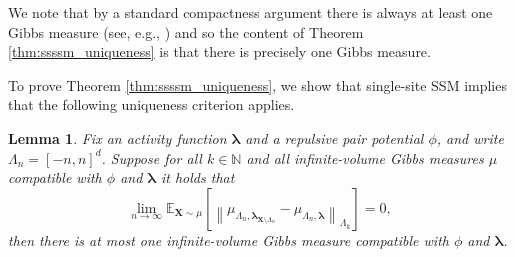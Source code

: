 \documentclass[10pt]{amsart}
\newtheorem{lemma}[theorem]{Lemma}
\theoremstyle{definition}
\theoremstyle{remark}
\newcommand{\bX}{\mathbf{X}}
\newcommand{\E}{\mathbb{E}}
\newcommand{\N}{\mathbb{N}}
\newcommand{\region}{\Lambda}
\newcommand{\potential}{\phi}
\newcommand{\activities}{\pmb{\lambda}}
\begin{document}
	We note that by a standard compactness argument there is always at least one Gibbs measure (see, e.g., \cite[Theorem~B.1]{jansen2019cluster}) and so the content of Theorem \ref{thm:ssssm_uniqueness} is that there is precisely one Gibbs measure.
	
	
	
	To prove Theorem \ref{thm:ssssm_uniqueness}, we show that single-site SSM implies that the following uniqueness criterion applies.
	
	\begin{lemma}\label{lemma:uniqueness_expectation}
		Fix an activity function $\activities$ and a repulsive pair potential $\potential$, and write $\region_n = [-n, n]^d$.
		Suppose for all $k \in \N$ and all infinite-volume Gibbs measures $\mu$ compatible with $\potential$ and $\activities$ it holds that
		\[
		\lim_{n \to \infty} \E_{\bX \sim \mu} \left[\left\|\mu_{\region_{n}, \activities_{\bX \setminus \region_n}} - \mu_{\region_{n}, \activities} \right\|_{\region_k}\right] = 0,
		\]
		then there is at most one infinite-volume Gibbs measure compatible with $\potential$ and $\activities$.
	\end{lemma}
	
\end{document}
